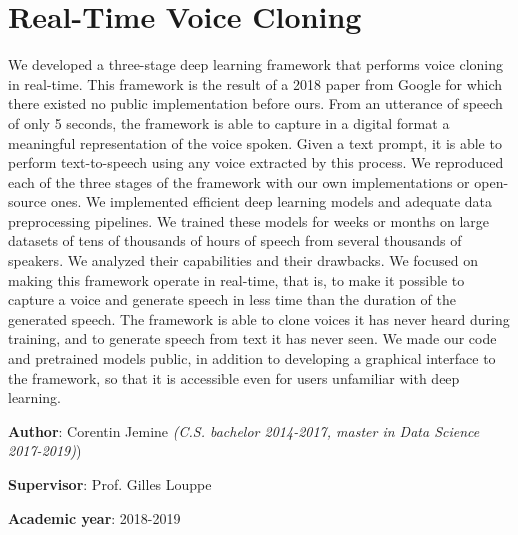 \documentclass[a4paper, oneside, 12pt, english]{article}
\begin{document}
\section*{Real-Time Voice Cloning}
We developed a three-stage deep learning framework that performs voice cloning in real-time. This framework is the result of a 2018 paper from Google for which there existed no public implementation before ours. From an utterance of speech of only 5 seconds, the framework is able to capture in a digital format a meaningful representation of the voice spoken. Given a text prompt, it is able to perform text-to-speech using any voice extracted by this process. We reproduced each of the three stages of the framework with our own implementations or open-source ones. We implemented efficient deep learning models and adequate data preprocessing pipelines. We trained these models for weeks or months on large datasets of tens of thousands of hours of speech from several thousands of speakers. We analyzed their capabilities and their drawbacks. We focused on making this framework operate in real-time, that is, to make it possible to capture a voice and generate speech in less time than the duration of the generated speech. The framework is able to clone voices it has never heard during training, and to generate speech from text it has never seen. We made our code and pretrained models public, in addition to developing a graphical interface to the framework, so that it is accessible even for users unfamiliar with deep learning.

\vspace{2cm}

\noindent \textbf{Author}: Corentin Jemine {\small \textit{(C.S. bachelor 2014-2017, master in Data Science 2017-2019)})}

\noindent \textbf{Supervisor}: Prof. Gilles Louppe

\noindent \textbf{Academic year}: 2018-2019
\end{document}
